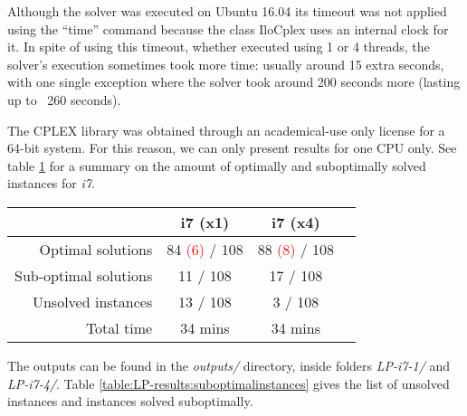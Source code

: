 Although the solver was executed on Ubuntu 16.04 its timeout was not applied using
the ``time'' command because the class IloCplex uses an internal clock for it. In
spite of using this timeout, whether executed using 1 or 4 threads, the solver's
execution sometimes took more time: usually around 15 extra seconds, with one single
exception where the solver took around 200 seconds more (lasting up to ~260 seconds).

\hfill

The CPLEX library was obtained through an academical-use only license for a 64-bit system.
For this reason, we can only present results for one CPU only. See table \ref{table:LP-results}
for a summary on the amount of optimally and suboptimally solved instances for \textit{i7}.

\begin{table}[H]
\centering
	\begin{tabular}{rccc}
								& i7 (x1)	& i7 (x4) \\
		\midrule
		Optimal solutions		& 84 \textcolor{red}{(6)} / 108
											& 88 \textcolor{red}{(8)} / 108 \\
		Sub-optimal solutions	& 11 / 108	& 17 / 108 \\
		Unsolved instances		& 13 / 108	& 3 / 108 \\
		Total time				& 34 mins	& 34 mins \\
	\end{tabular}
	\label{table:LP-results}
\end{table}

The outputs can be found in the \textit{outputs/} directory, inside folders
\textit{LP-i7-1/} and \textit{LP-i7-4/}. Table \ref{table:LP-results:suboptimalinstances}
gives the list of unsolved instances and instances solved suboptimally.

